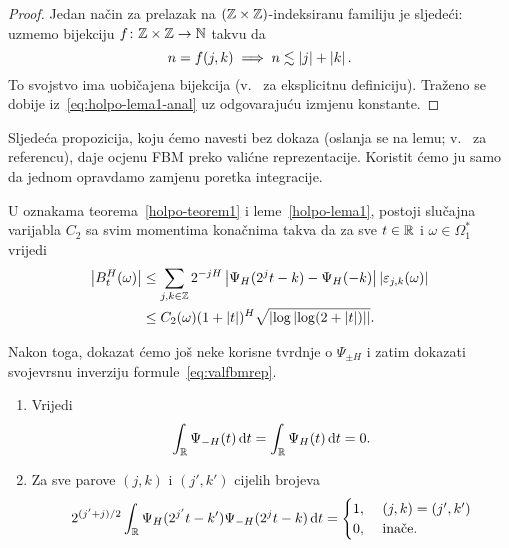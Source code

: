 \documentclass[main.tex]{subfiles}
\begin{document}
\begin{proof}
	Jedan način za prelazak na \( (\mathbb{Z}\times\mathbb{Z}) \)-indeksiranu familiju je sljedeći:
	uzmemo bijekciju \( f\colon \mathbb{Z}\times\mathbb{Z} \to \mathbb{N} \) takvu da
	\[
		n = f(j,k) \implies n \lesssim \left| {j} \right| + \left| {k} \right|.
	\]
	To svojstvo ima uobičajena bijekcija (v.~\cite[lema~2]{jourfa-ayache} za eksplicitnu definiciju).
	Traženo se dobije iz~\eqref{eq:holpo-lema1-anal} uz odgovarajuću izmjenu konstante.

\end{proof}

Sljedeća propozicija, koju ćemo navesti bez dokaza (oslanja se na lemu; v.~\cite[prop.~3.17]{ayache} za referencu), daje ocjenu FBM preko valićne reprezentacije. Koristit ćemo
ju samo da jednom opravdamo zamjenu poretka integracije.

\begin{propozicija}\label{holpo-prop1}
	U oznakama teorema~\ref{holpo-teorem1} i leme~\ref{holpo-lema1}, postoji
	slučajna varijabla \( C_2 \) sa svim momentima konačnima takva
	da za sve \( t \in \mathbb{R} \) i \( \omega \in \Omega_1^* \) vrijedi
	\begin{align}
		\left| {B^H_t(\omega)} \right|
		 & \le \sum_{j,k \in \mathbb{Z}} 2^{-jH} \left| {\Psi_H(2^jt-k)-\Psi_H(-k)} \right| \left| {\varepsilon_{j,k}(\omega)} \right|
		\\ &\le C_2(\omega)(1+\left| {t} \right|)^H\sqrt{\left| {\log \left| {\log (2 + \left| {t} \right|)} \right|} \right|}.
	\end{align}
\end{propozicija}

Nakon toga, dokazat ćemo još neke korisne tvrdnje o \( \Psi_{\pm H} \)
i zatim dokazati svojevrsnu inverziju formule~\eqref{eq:valfbmrep}.

\begin{lema}\label{holpo-lema2}
	\begin{enumerate}[label=(\roman*)]
		\item Vrijedi \label{holpo-lema2-itemi}
		      \begin{equation}
			      \int_{\mathbb{R}} \Psi_{-H}(t) \,\mathrm d t = \int_{\mathbb{R}} \Psi_H(t) \,\mathrm d t = 0.
		      \end{equation}
		\item Za sve parove \( (j,k) \) i \( (j',k') \) cijelih brojeva \label{holpo-lema2-itemii}
		      \begin{equation}\label{eq:intpsihpsi-h}
			      2^{(j'+j)/2}\int_{\mathbb{R}} \Psi_H(2^{j'}t-k')\Psi_{-H}(2^jt-k) \,\mathrm d t =
			      \begin{cases}
				      1, \  & (j,k)=(j',k') \\
				      0, \  & \text{inače}.
			      \end{cases}
		      \end{equation}
	\end{enumerate}
\end{lema}
\end{document}
